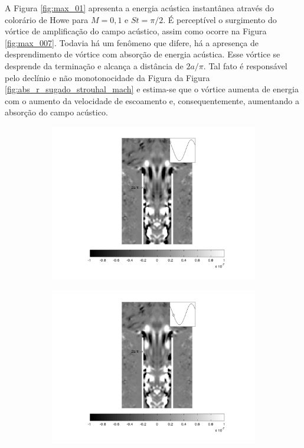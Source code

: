 A Figura \ref{fig:max_01} apresenta a energia acústica instantânea através do colorário de Howe para $M = 0,1$ e $St = \pi/2$. É perceptível o surgimento do vórtice de amplificação do campo acústico, assim como ocorre na Figura \ref{fig:max_007}. Todavia há um fenômeno que difere, há a apresença de desprendimento de vórtice com absorção de energia acústica. Esse vórtice se desprende da terminação e alcança a distância de $2a/\pi$. Tal fato é responsável pelo declínio e não monotonocidade da Figura da Figura \ref{fig:abs_r_sugado_strouhal_mach} e estima-se que o vórtice aumenta de energia com o aumento da velocidade de escoamento e, consequentemente, aumentando a absorção do campo acústico.

\begin{landscape}
\newpage
\vfill
\begin{figure}[ht!]
\begin{subfigure}{0.55 \textwidth}
  \includegraphics[width=1.\linewidth]{figuras/max_ka_01_1.png}
  \caption[]{}
  \label{fig:max_01_1}
\end{subfigure}
\begin{subfigure}{0.55 \textwidth}
  \includegraphics[width=1.\linewidth]{figuras/max_ka_01_2.png}

\end{subfigure}
\end{figure}
\end{landscape}
